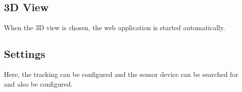 \subsection{3D View}

\begin{minipage}{0.45\textwidth}
When the 3D view is chosen, the web application is started automatically.
\end{minipage} \hfill

\subsection{Settings}

\begin{minipage}{0.45\textwidth}
Here, the tracking can be configured and the sensor device can be searched for and also be configured.
\end{minipage} \hfill
\begin{minipage}{0.5\textwidth}
\end{minipage}
